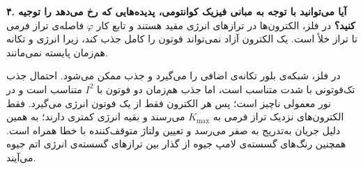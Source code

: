 \khat

\noindent\textbf{۴. آیا می‌توانید با توجه به مبانی فیزیک کوانتومی، پدیده‌هایی که رخ می‌دهد را توجیه کنید؟}
\newline
در فلز، الکترون‌ها در ترازهای انرژی مقید هستند و تابع کار \(\varphi\) فاصله‌ی
تراز فرمی تا تراز خلأ است. یک الکترون آزاد نمی‌تواند فوتون را کامل جذب کند،
زیرا انرژی و تکانه هم‌زمان پایسته نمی‌مانند.

در فلز، شبکه‌ی بلور تکانه‌ی
اضافی را می‌گیرد و جذب ممکن می‌شود. احتمال جذب تک‌فوتونی با شدت
متناسب است، اما جذب هم‌زمان دو فوتون با \(I^2\) متناسب است و در نور معمولی
ناچیز است؛ پس هر الکترون فقط از یک فوتون انرژی می‌گیرد.
فقط الکترون‌های نزدیک تراز فرمی به \(K_{\max}\) می‌رسند و بقیه انرژی کمتری
دارند؛ به همین دلیل جریان به‌تدریج به صفر می‌رسد و تعیین ولتاژ متوقف‌کننده
با خطا همراه است. همچنین رنگ‌های گسسته‌ی لامپ جیوه از گذار بین ترازهای
گسسته‌ی انرژی اتم جیوه می‌آیند.